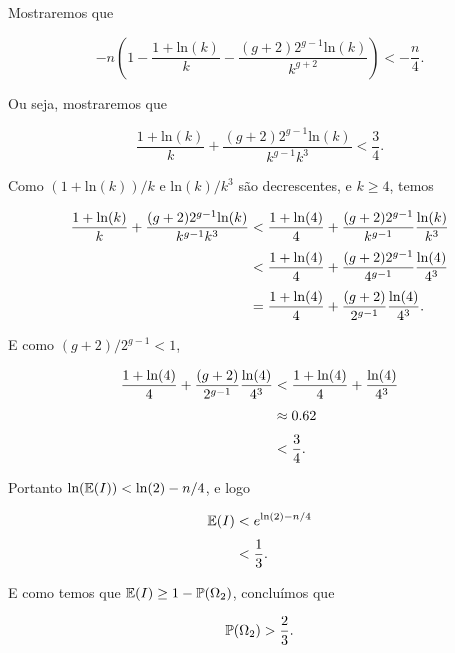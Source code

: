 Mostraremos que 

\[-n\left(1 - \frac{1+\text{ln}(k)}{k} - \frac{(g+2)2^{g-1} \text{ln}(k)}{k^{g+2}}\right) < -\frac{n}{4}.\]

Ou seja, mostraremos que

\[\frac{1+\text{ln}(k)}{k} + \frac{(g+2)2^{g-1} \text{ln}(k)}{k^{g-1}k^3} < \frac{3}{4}.\]

Como $(1+\text{ln}(k))/k$ e $\text{ln}(k)/k^3$ são decrescentes, e $k \geq 4$, temos

\begin{equation*}
\setlength{\jot}{6pt}
\begin{aligned}
\frac{1+\text{ln}(k)}{k} + \frac{(g+2)2^{g-1} \text{ln}(k)}{k^{g-1}k^3} &< \frac{1+\text{ln}(4)}{4} + \frac{(g+2)2^{g-1}}{k^{g-1}}\frac{\text{ln}(k)}{k^3}\\
&< \frac{1+\text{ln}(4)}{4} + \frac{(g+2)2^{g-1}}{4^{g-1}}\frac{\text{ln}(4)}{4^3} \\
&= \frac{1+\text{ln}(4)}{4} + \frac{(g+2)}{2^{g-1}}\frac{\text{ln}(4)}{4^3}.
\end{aligned}
\end{equation*}

E como $(g+2)/2^{g-1} < 1$, 

\begin{equation*}
\setlength{\jot}{6pt}
\begin{aligned}
\frac{1+\text{ln}(4)}{4} + \frac{(g+2)}{2^{g-1}}\frac{\text{ln}(4)}{4^3} &< \frac{1+\text{ln}(4)}{4} + \frac{\text{ln}(4)}{4^3} \\
&\approx 0.62 \\
&< \frac{3}{4}.
\end{aligned}
\end{equation*}

Portanto $\text{ln}(\mathbb{E}(I)) < \text{ln}(2) - n/4$, e logo

\begin{equation*}
\setlength{\jot}{6pt}
\begin{aligned}
\bbe(I) &< e^{\text{ln}(2)-n/4} \\
&< \frac{1}{3}.
\end{aligned}
\end{equation*}

E como temos que $\mathbb{E}(I) \geq 1 - \mathbb{P}(\Omega_2)$, concluímos que

\begin{equation}\label{teoerdosomega2}
\mathbb{P}(\Omega_2) > \frac{2}{3}.
\end{equation}

